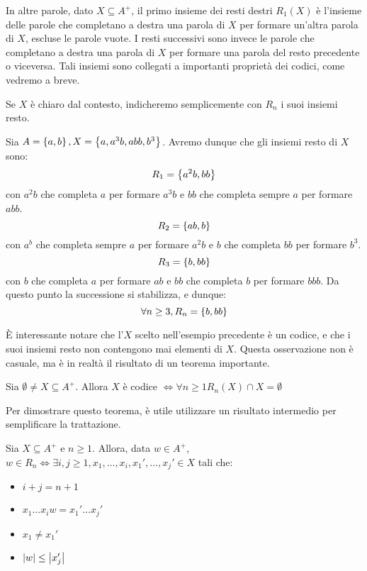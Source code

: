 In altre parole, dato \(X \subseteq A^+\), il primo insieme dei resti destri \(R_1(X)\) è l'insieme delle parole che completano a destra una parola di \(X\) per formare un'altra parola di \(X\), escluse le parole vuote.
I resti successivi sono invece le parole che completano a destra una parola di \(X\) per formare una parola del resto precedente o viceversa.
Tali insiemi sono collegati a importanti proprietà dei codici, come vedremo a breve.
\begin{note}
  Se \(X\) è chiaro dal contesto, indicheremo semplicemente con \(R_n\) i suoi insiemi resto.
\end{note}
\begin{example}
  Sia \(A = \set{a,b}, X = \set{a,a^3b,abb,b^3}\).
  Avremo dunque che gli insiemi resto di \(X\) sono:
  \[R_1 = \set{a^2b, bb}\]
  con \(a^2b\) che completa \(a\) per formare \(a^3b\) e \(bb\) che completa sempre \(a\) per formare \(abb\).
  \[R_2 = \set{ab,b}\]
  con \(a^b\) che completa sempre \(a\) per formare \(a^2b\) e \(b\) che completa \(bb\) per formare \(b^3\).
  \[R_3 = \set{b,bb}\]
  con \(b\) che completa \(a\) per formare \(ab\) e \(bb\) che completa \(b\) per formare \(bbb\).
  Da questo punto la successione si stabilizza, e dunque:
  \[\forall n \geq 3, R_n = \set{b,bb}\]
\end{example}

È interessante notare che l'\(X\) scelto nell'esempio precedente è un codice, e che i suoi insiemi resto non contengono mai elementi di \(X\).
Questa osservazione non è casuale, ma è in realtà il risultato di un teorema importante.
\begin{theorem}\label{thm:sardinas-patterson}
  Sia \(\emptyset \neq X \subseteq A^+\). Allora \(X\) è codice \(\iff \forall n\geq 1 R_n(X) \cap X = \emptyset\)
\end{theorem}

Per dimostrare questo teorema, è utile utilizzare un risultato intermedio per semplificare la trattazione.

\begin{lemma}\label{lem:sardinas-patterson-intermediate}
  Sia \(X \subseteq A^+\) e \(n\geq 1\). Allora, data \(w \in A^+\), \(w \in R_n \iff \exists i,j\geq 1, x_1,\ldots,x_i,x_1',\ldots,x_j' \in X\) tali che:
  \begin{itemize}
    \item \(i+j=n+1\)
    \item \(x_1\ldots x_{i}w = x_1'\ldots x_j'\)
    \item \(x_1 \neq x_1'\)
    \item \(\left|w\right| \leq \left|x_j'\right|\)
  \end{itemize}
\end{lemma}

